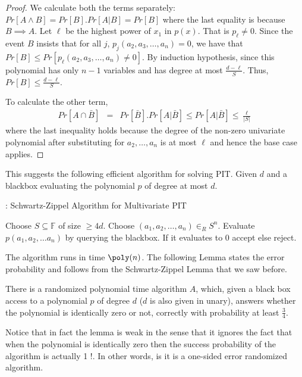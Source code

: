 \begin{proof}
We calculate both the terms separately: $Pr[A \land B] = Pr[B].Pr[A|B]
= Pr[B]$ where the last equality is because $B \implies A$.  Let
$\ell$ be the highest power of $x_1$ in $p(x)$. That is $p_\ell \ne
0$. Since the event $B$ insists that for all $j$, $p_j(a_2, a_3,
\ldots , a_n)=0$, we have that $Pr[B] \leq Pr[p_\ell(a_2, a_3, \ldots, a_n) \ne 0]$.  By induction hypothesis, since this polynomial has
only $n-1$ variables and has degree at most $\frac{d -
  \ell}{S}$. Thus, $Pr[B] \le \frac{d - \ell}{S}$.

\noindent To calculate the other term,
\begin{eqnarray*}
Pr[A \cap \bar{B}] & = & Pr[\bar{B}].Pr[A|\bar{B}] \le Pr[A|\bar{B}] \le \frac{\ell}{|S|}
\end{eqnarray*}
where the last inequality holds because the degree of the non-zero
univariate polynomial after substituting for $a_2, \ldots, a_n$ is at
most $\ell$ and hence the base case applies.
\end{proof}

This suggests the following efficient algorithm for solving PIT. Given $d$ and a
blackbox evaluating the polynomial $p$ of degree at most $d$.


\begin{algorithm}%
\label{alg:sz-pit}
\caption{: Schwartz-Zippel Algorithm for Multivariate PIT}
\begin{algorithmic}[1]
\State Choose $S \subseteq \mathbb{F}$ of size $\ge 4d$.
\State Choose $(a_1, a_2, \ldots, a_n) \in_R S^n$.
\State Evaluate $p(a_1, a_2, \ldots a_n)$ by querying the blackbox.
\State If it evaluates to 0 accept else reject.
\end{algorithmic}
\end{algorithm}

The algorithm runs in time $\poly(n)$. The following
Lemma states the error probability and follows from the
Schwartz-Zippel Lemma that we saw before.
\begin{lemma}
There is a randomized polynomial time algorithm $A$, which, given a black
box access to a polynomial $p$ of degree $d$ ($d$ is also given in unary), answers whether the polynomial is identically zero or not, correctly
with probability at least $\frac{3}{4}$.
\end{lemma}

Notice that in fact the lemma is weak in the sense that it ignores the
fact that when the polynomial is identically zero then the success
probability of the algorithm is actually 1 !. In other words, is it is a one-sided error randomized algorithm.
